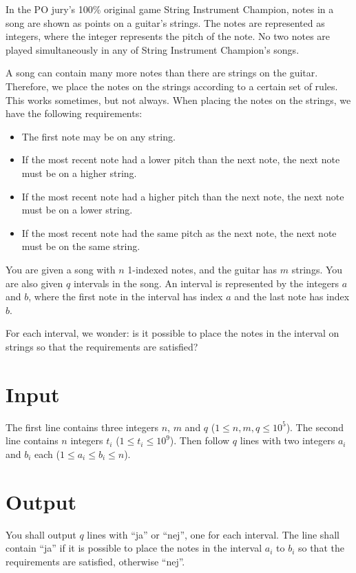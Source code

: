 
In the PO jury's 100\% original game String Instrument Champion, notes in a song are shown as points on a guitar's strings.
The notes are represented as integers, where the integer represents the pitch of the note.
No two notes are played simultaneously in any of String Instrument Champion's songs.

A song can contain many more notes than there are strings on the guitar.
Therefore, we place the notes on the strings according to a certain set of rules.
This works sometimes, but not always. When placing the notes on the strings, we have the following requirements:
\begin{itemize}
\item The first note may be on any string.
\item If the most recent note had a lower pitch than the next note, the next note must be on a higher string.
\item If the most recent note had a higher pitch than the next note, the next note must be on a lower string.
\item If the most recent note had the same pitch as the next note, the next note must be on the same string.
\end{itemize}

You are given a song with $n$ 1-indexed notes, and the guitar has $m$ strings. You are also given $q$ intervals in the song.
An interval is represented by the integers $a$ and $b$, where the first note in the interval has index $a$ and the last note has index $b$.

For each interval, we wonder: is it possible to place the notes in the interval on strings so that the requirements are satisfied?

\section*{Input}
The first line contains three integers $n$, $m$ and $q$ ($1 \leq n, m, q \leq 10^5$).
The second line contains $n$ integers $t_i$ ($1 \leq t_i \leq 10^9$).
Then follow $q$ lines with two integers $a_i$ and $b_i$ each ($1 \leq a_i \leq b_i \leq n$).

\section*{Output}
You shall output $q$ lines with ``ja'' or ``nej'', one for each interval.
The line shall contain ``ja'' if it is possible to place the notes in the interval $a_i$ to $b_i$ so that the requirements are satisfied, otherwise ``nej''.

